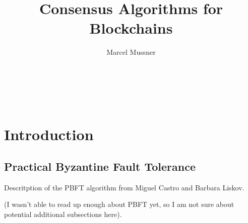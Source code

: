 \documentclass{acm_proc_article-sp}
\begin{document}
\title{Consensus Algorithms for Blockchains}

\author{Marcel Mussner\\
       \\
       \\
       \\
       \\
}

\maketitle


\begin{abstract}


\end{abstract}




\section{Introduction}






\subsection{Practical Byzantine Fault Tolerance}

Descritption of the PBFT algorithm from Miguel Castro and Barbara Liskov.

(I wasn't able to read up enough about PBFT yet, so I am not sure about potential additional subsections here).
\end{document}
